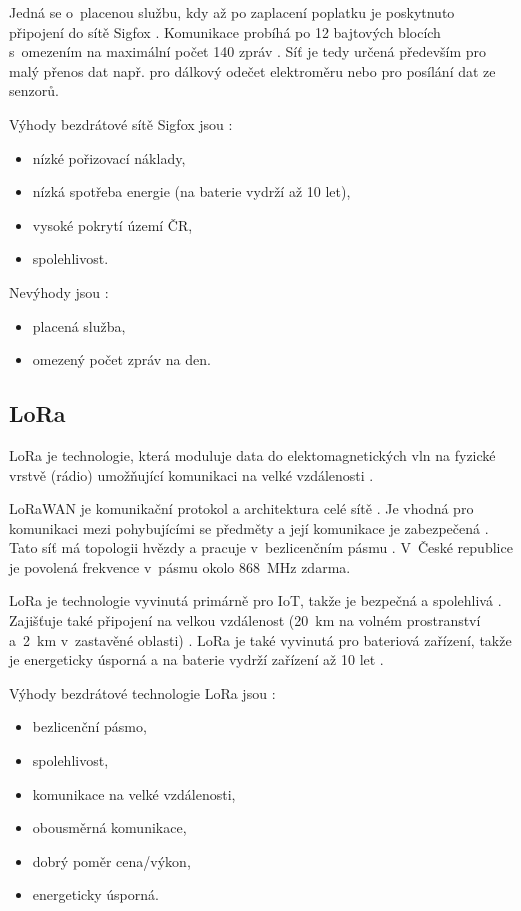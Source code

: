 Jedná se o~placenou službu, kdy až po zaplacení poplatku je poskytnuto připojení do sítě Sigfox \cite{Sigfox_Zooco}. Komunikace probíhá po 12 bajtových 
blocích s~omezením na maximální počet 140 zpráv \cite{Sigfox_Zooco}. Síť je tedy určená především pro malý přenos dat např. pro dálkový odečet elektroměru 
nebo pro posílání dat ze senzorů. 

Výhody bezdrátové sítě Sigfox jsou \cite{Sigfox_cz} \cite{Sigfox_Zooco}:
\begin{itemize}
  \item nízké pořizovací náklady,
  \item nízká spotřeba energie (na baterie vydrží až 10 let),
  \item vysoké pokrytí území ČR,
  \item spolehlivost.
\end{itemize}

Nevýhody jsou \cite{Sigfox_cz}:
\begin{itemize}
  \item placená služba,
  \item omezený počet zpráv na den.
\end{itemize}

\subsection{LoRa}
LoRa je technologie, která moduluje data do elektomagnetických vln na fyzické vrstvě (rádio) umožňující komunikaci na velké vzdálenosti \cite{LoRa_eman}. 

LoRaWAN je komunikační protokol a architektura celé sítě \cite{LoRa_eman}. Je vhodná pro komunikaci mezi pohybujícími se předměty a její komunikace je 
zabezpečená \cite{LoRa_eman}. Tato síť má topologii hvězdy a pracuje v~bezlicenčním pásmu \cite{LoRa_eman}. V~České republice je povolená frekvence v~pásmu 
okolo 868~MHz zdarma.

LoRa je technologie vyvinutá primárně pro IoT, takže je bezpečná a spolehlivá \cite{LoRa_IoT_PORT}. Zajišťuje také připojení na velkou vzdálenost (20~km na 
volném prostranství a~2~km v~zastavěné oblasti) \cite{LoRa_IoT_PORT}. LoRa je také vyvinutá pro bateriová zařízení, takže je energeticky úsporná a na baterie
 vydrží zařízení až 10 let \cite{LoRa_IoT_PORT}.

Výhody bezdrátové technologie LoRa jsou \cite{LoRa_IoT_PORT}:
\begin{itemize}
  \item bezlicenční pásmo,
  \item spolehlivost,
  \item komunikace na velké vzdálenosti,
  \item obousměrná komunikace,
  \item dobrý poměr cena/výkon,
  \item energeticky úsporná.
\end{itemize}


